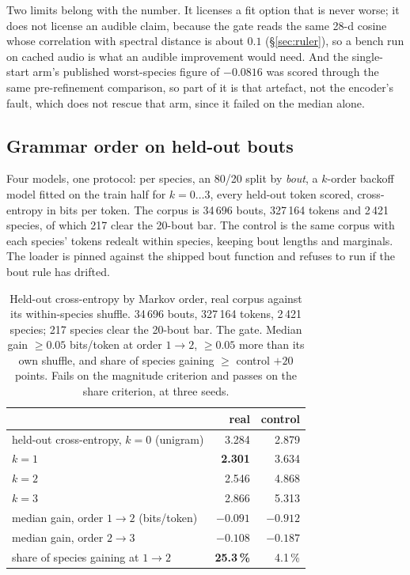 \documentclass[10pt,twocolumn,a4paper]{article}
\begin{document}
Two limits belong with the number. It licenses a fit option that is never worse; it does not
license an audible claim, because the gate reads the same 28-d cosine whose correlation with
spectral distance is about $0.1$ (\S\ref{sec:ruler}), so a bench run on cached audio is what
an audible improvement would need. And the single-start arm's published worst-species figure
of $-0.0816$ was scored through the same pre-refinement comparison, so part of it is that
artefact, not the encoder's fault, which does not rescue that arm, since it failed
on the median alone.

\subsection{Grammar order on held-out bouts}

Four models, one protocol: per species, an 80/20 split by \emph{bout}, a $k$-order backoff
model fitted on the train half for $k = 0 \ldots 3$, every held-out token scored,
cross-entropy in bits per token. The corpus is 34\,696 bouts, 327\,164 tokens and 2\,421
species, of which 217 clear the 20-bout bar. The control is the same corpus with each
species' tokens redealt within species, keeping bout lengths and marginals. The loader is
pinned against the shipped bout function and refuses to run if the bout rule has drifted.

\begin{table}[t]
\centering
\small
\caption{Held-out cross-entropy by Markov order, real corpus against its within-species
shuffle. 34\,696 bouts, 327\,164 tokens, 2\,421 species; 217 species clear the 20-bout bar.
The gate. Median gain $\ge 0.05$ bits/token at order $1 \to 2$, $\ge 0.05$ more than its
own shuffle, and share of species gaining $\ge$ control $+ 20$ points. Fails on the
magnitude criterion and passes on the share criterion, at three seeds.}
\label{tab:orders}
\begin{tabular}{L{7.4cm} r r}
\toprule
& real & control \\
\midrule
held-out cross-entropy, $k = 0$ (unigram) & 3.284 & 2.879 \\
$k = 1$ & \textbf{2.301} & 3.634 \\
$k = 2$ & 2.546 & 4.868 \\
$k = 3$ & 2.866 & 5.313 \\
\midrule
median gain, order $1 \to 2$ (bits/token) & $\mathbf{-0.091}$ & $-0.912$ \\
median gain, order $2 \to 3$ & $-0.108$ & $-0.187$ \\
share of species gaining at $1 \to 2$ & \textbf{25.3\,\%} & 4.1\,\% \\
\bottomrule
\end{tabular}
\end{table}
\end{document}
